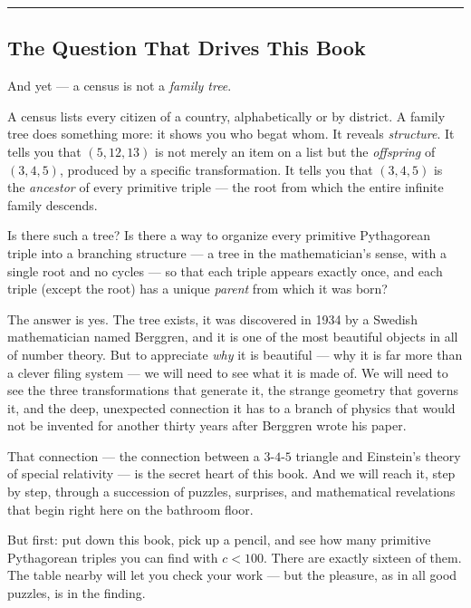 \documentclass[12pt, letterpaper, openany]{book}
\theoremstyle{definition}
\theoremstyle{remark}
\begin{document}
\bigskip\noindent\rule{\textwidth}{0.4pt}\bigskip



\subsection*{The Question That Drives This Book}


And yet --- a census is not a \textit{family tree}.

A census lists every citizen of a country, alphabetically or by district. A family tree does something more: it shows you who begat whom. It reveals \textit{structure}. It tells you that $(5, 12, 13)$ is not merely an item on a list but the \textit{offspring} of $(3, 4, 5)$, produced by a specific transformation. It tells you that $(3, 4, 5)$ is the \textit{ancestor} of every primitive triple --- the root from which the entire infinite family descends.

Is there such a tree? Is there a way to organize every primitive Pythagorean triple into a branching structure --- a tree in the mathematician's sense, with a single root and no cycles --- so that each triple appears exactly once, and each triple (except the root) has a unique \textit{parent} from which it was born?

The answer is yes. The tree exists, it was discovered in 1934 by a Swedish mathematician named Berggren, and it is one of the most beautiful objects in all of number theory. But to appreciate \textit{why} it is beautiful --- why it is far more than a clever filing system --- we will need to see what it is made of. We will need to see the three transformations that generate it, the strange geometry that governs it, and the deep, unexpected connection it has to a branch of physics that would not be invented for another thirty years after Berggren wrote his paper.

That connection --- the connection between a $3$-$4$-$5$ triangle and Einstein's theory of special relativity --- is the secret heart of this book. And we will reach it, step by step, through a succession of puzzles, surprises, and mathematical revelations that begin right here on the bathroom floor.

But first: put down this book, pick up a pencil, and see how many primitive Pythagorean triples you can find with $c < 100$. There are exactly sixteen of them. The table nearby will let you check your work --- but the pleasure, as in all good puzzles, is in the finding.
\end{document}
